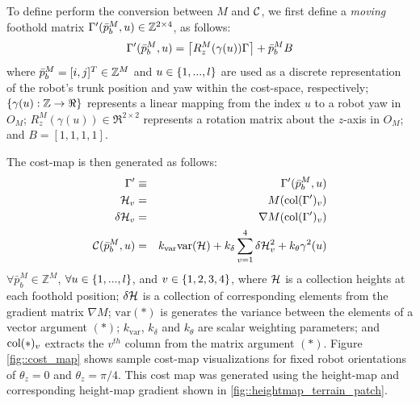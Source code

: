 			To define perform the conversion between $M$ and ${\cal C}$, we first define a \emph{moving} foothold matrix $\Gamma'(\bar{p}^{M}_{b},u) \in {\Bbb Z}^{2\times4}$, as follows:
				\begin{equation}
					\Gamma'(\bar{p}^{M}_{b},u) = \left\lceil R_{z}^{M}(\gamma(u))\Gamma \right\rceil + \bar{p}^{M}_{b} B \\
				\end{equation}
			where  $\bar{p}^{M}_{b} = [i,j]^T\in{\Bbb Z}^{M}$ and $u \in \left\{1,...,l\right\}$ are used as a discrete representation of the robot's trunk position and yaw within the cost-space, respectively; $\left\{\gamma(u) : {\Bbb Z} \rightarrow \Re \right\}$ represents a linear mapping from the index $u$ to a robot yaw in $O_{M}$; $R_{z}^{M}(\gamma(u))\in\Re^{2\times2}$ represents a rotation matrix about the $z$-axis in $O_{M}$; and $B = [1,1,1,1]$. 

			The cost-map is then generated as follows:
				\begin{eqnarray}
					\Gamma'	 				&\equiv& \Gamma'(\bar{p}^{M}_{b},u) \nonumber \\
					{\cal H}_{v} 			&=& M(\text{col}(\Gamma')_{v})	 \nonumber\\
					\delta {\cal H}_{v} 	&=& \nabla M(\text{col}(\Gamma')_{v}) \nonumber\\
					{\cal C}(\bar{p}^{M}_{b},u) 		&=& k_{\text{var}} \text{var}({\cal H}) + k_{\delta}\sum_{v=1}^{4} \delta {\cal H}_{v}^{2} + k_{\theta} \gamma^{2}(u) 
				\end{eqnarray}
			$\forall \bar{p}^{M}_{b} \in \mathbb{Z}^{M}$, $\forall u \in \left\{1,...,l\right\}$, and  $v \in \left\{1,2,3,4\right\}$, where ${\cal H}$ is a collection heights at each foothold position; $\delta{\cal H}$ is a collection of corresponding elements from the gradient matrix $\nabla M$; $\text{var}(*)$ is generates the variance between the elements of a vector argument $(*)$; $k_{\text{var}}$, $k_{\delta}$ and $k_{\theta}$ are scalar weighting parameters; and $\text{col}(*)_{v}$ extracts the $v^{th}$ column from the matrix argument $(*)$. Figure \ref{fig::cost_map} shows sample cost-map visualizations for fixed robot orientations of $\theta_{z}=0$ and $\theta_{z}=\pi/4$. This cost map was generated using the height-map and corresponding height-map gradient shown in \ref{fig::heightmap_terrain_patch}.

